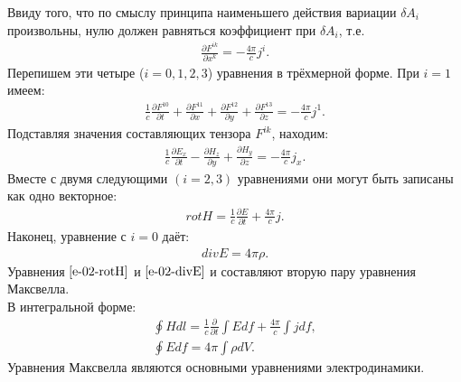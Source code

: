 Ввиду того, что по смыслу принципа наименьшего действия вариации $\delta A_i$ произвольны, нулю должен равняться коэффициент при $\delta A_i$, т.е.
\begin{gather}
	\label{e-02-deltaF}
	\frac{\partial F^{ik}}{\partial x^k} = -\frac{4\pi}{c}j^i.
\end{gather}
Перепишем эти четыре ($i = 0, 1, 2, 3$) уравнения в трёхмерной форме. При $i=1$ имеем:
\begin{gather*}
	\frac{1}{c}\frac{\partial F^{10}}{\partial t} + \frac{\partial F^{11}}{\partial x} + \frac{\partial F^{12}}{\partial y} + \frac{\partial F^{13}}{\partial z} = -\frac{4\pi}{c}j^1.
\end{gather*}
Подставляя значения составляющих тензора $F^{ik}$, находим:
\begin{gather*}
	\frac{1}{c}\frac{\partial E_x}{\partial t} - \frac{\partial H_z}{\partial y} + \frac{\partial H_y}{\partial z} = -\frac{4\pi}{c}j_x.
\end{gather*}
Вместе с двумя следующими $(i = 2, 3)$ уравнениями они могут быть записаны как одно векторное:
\begin{gather}
	\label{e-02-rotH}
	rot H = \frac{1}{c}\frac{\partial E}{\partial t} + \frac{4\pi}{c}j.
\end{gather}
Наконец, уравнение с $i=0$ даёт:
\begin{gather}
\label{e-02-divE}
	div E = 4\pi\rho.
\end{gather}
Уравнения $\ref{e-02-rotH}$ и $\ref{e-02-divE}$ и составляют вторую пару уравнения Максвелла.\\
В интегральной форме:\\
\begin{gather*}
	\oint Hdl = \frac{1}{c}\frac{\partial}{\partial t}\int Edf + \frac{4\pi}{c}\int jdf,\\
	\oint Edf = 4\pi\int \rho dV.
\end{gather*}
 Уравнения Максвелла являются основными уравнениями электродинамики.\\

